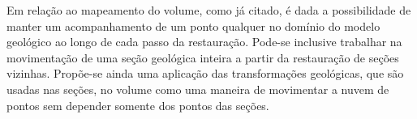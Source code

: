 Em relação ao mapeamento do volume, como já citado, é dada a possibilidade de manter um acompanhamento de um ponto qualquer no domínio do modelo geológico ao longo de cada passo da restauração. Pode-se inclusive trabalhar na movimentação de uma seção geológica inteira a partir da restauração de seções vizinhas. Propõe-se ainda uma aplicação das transformações geológicas, que são usadas nas seções, no volume como uma maneira de movimentar a nuvem de pontos sem depender somente dos pontos das seções.